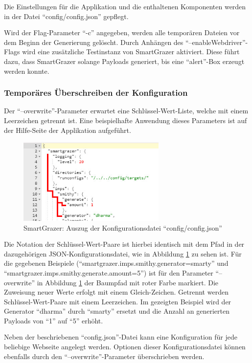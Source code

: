 \FloatBarrier
Die Einstellungen für die Applikation und die enthaltenen Komponenten werden in der Datei ``config/config.json'' gepflegt.

Wird der Flag-Parameter ``-c'' angegeben, werden alle temporären Dateien vor dem Beginn der Generierung gelöscht. Durch Anhängen des ``--enableWebdriver''-Flags wird eine zusätzliche Testinstanz von SmartGrazer aktiviert. Diese führt dazu, dass SmartGrazer solange Payloads generiert, bis eine ``alert''-Box erzeugt werden konnte.

\subsubsection{Temporäres Überschreiben der Konfiguration}

Der ``--overwrite''-Parameter erwartet eine Schlüssel-Wert-Liste, welche mit einem Leerzeichen getrennt ist. Eine beispielhafte Anwendung dieses Parameters ist auf der Hilfe-Seite der Applikation aufgeführt.

\begin{figure}[htbp] 
	\centering
	\includegraphics[width=0.65\textwidth]{contents/images/JSONConfigOverwritePath}
	\caption{SmartGrazer: Auszug der Konfigurationsdatei ``config/config.json''}
	\label{fig:config-json}
\end{figure}

\FloatBarrier
Die Notation der Schlüssel-Wert-Paare ist hierbei identisch mit dem Pfad in der dazugehörigen JSON-Konfigurationsdatei, wie in Abbildung \ref{fig:config-json} zu sehen ist. Für die gegebenen Beispiele (``smartgrazer.imps.smithy.generator=smarty'' und\\ ``smartgrazer.imps.smithy.generate.amount=5'') ist für den Parameter ``--overwrite'' in Abbildung \ref{fig:config-json} der Baumpfad mit roter Farbe markiert. Die Zuweisung neuer Werte erfolgt mit einem Gleich-Zeichen. Getrennt werden Schlüssel-Wert-Paare mit einem Leerzeichen. Im gezeigten Beispiel wird der Generator ``dharma'' durch ``smarty'' ersetzt und die Anzahl an generierten Payloads von ``1'' auf ``5'' erhöht.

Neben der beschriebenen ``config.json''-Datei kann eine Konfiguration für jede beliebige Webseite angelegt werden. Optionen dieser Konfigurationsdatei können ebenfalls durch den ``--overwrite''-Parameter überschrieben werden.
